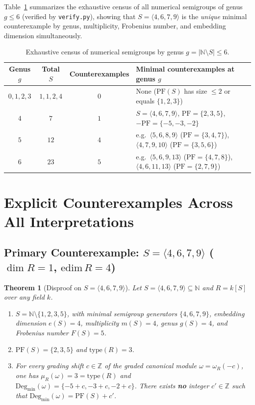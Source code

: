\documentclass[11pt]{article}
\newtheorem{theorem}{Theorem}[section]
\theoremstyle{definition}
\theoremstyle{remark}
\begin{document}
Table~\ref{tab:genus-census} summarizes the exhaustive census of all numerical semigroups of genus $g \le 6$ (verified by \texttt{verify.py}), showing that $S = \langle 4, 6, 7, 9 \rangle$ is the \emph{unique} minimal counterexample by genus, multiplicity, Frobenius number, and embedding dimension simultaneously.

\begin{table}[ht]
\centering
\caption{Exhaustive census of numerical semigroups by genus $g = |\mathbb{N} \setminus S| \le 6$.}
\label{tab:genus-census}
\vspace{4pt}
\small
\begin{tabular}{cccl}
\hline
Genus $g$ & Total $S$ & Counterexamples & Minimal counterexamples at genus $g$ \\
\hline
$0, 1, 2, 3$ & $1, 1, 2, 4$ & $0$ & None ($\mathrm{PF}(S)$ has size $\le 2$ or equals $\{1,2,3\}$) \\
$4$ & $7$ & $1$ & $S = \langle 4, 6, 7, 9 \rangle$, $\mathrm{PF} = \{2, 3, 5\}$, $-\mathrm{PF} = \{-5, -3, -2\}$ \\
$5$ & $12$ & $4$ & e.g.\ $\langle 5, 6, 8, 9 \rangle$ ($\mathrm{PF} = \{3, 4, 7\}$), $\langle 4, 7, 9, 10 \rangle$ ($\mathrm{PF} = \{3, 5, 6\}$) \\
$6$ & $23$ & $5$ & e.g.\ $\langle 5, 6, 9, 13 \rangle$ ($\mathrm{PF} = \{4, 7, 8\}$), $\langle 4, 6, 11, 13 \rangle$ ($\mathrm{PF} = \{2, 7, 9\}$) \\
\hline
\end{tabular}
\end{table}

\section{Explicit Counterexamples Across All Interpretations}

\subsection{Primary Counterexample: $S = \langle 4, 6, 7, 9 \rangle$ ($\dim R = 1$, $\mathrm{edim}\, R = 4$)}

\begin{theorem}[Disproof on $S = \langle 4, 6, 7, 9 \rangle$]\label{thm:cex-4679}
Let $S = \langle 4, 6, 7, 9 \rangle \subseteq \mathbb{N}$ and $R = k[S]$ over any field $k$.
\begin{enumerate}
  \item[(a)] $S = \mathbb{N} \setminus \{1, 2, 3, 5\}$, with minimal semigroup generators $\{4, 6, 7, 9\}$, embedding dimension $e(S) = 4$, multiplicity $m(S) = 4$, genus $g(S) = 4$, and Frobenius number $F(S) = 5$.
  \item[(b)] $\mathrm{PF}(S) = \{2, 3, 5\}$ and $\mathrm{type}(R) = 3$.
  \item[(c)] For every grading shift $c \in \mathbb{Z}$ of the graded canonical module $\omega = \omega_R(-c)$, one has $\mu_R(\omega) = 3 = \mathrm{type}(R)$ and $\mathrm{Deg}_{\min}(\omega) = \{-5 + c, -3 + c, -2 + c\}$. There exists \textbf{no} integer $c' \in \mathbb{Z}$ such that $\mathrm{Deg}_{\min}(\omega) = \mathrm{PF}(S) + c'$.
\end{enumerate}
\end{theorem}
\end{document}
